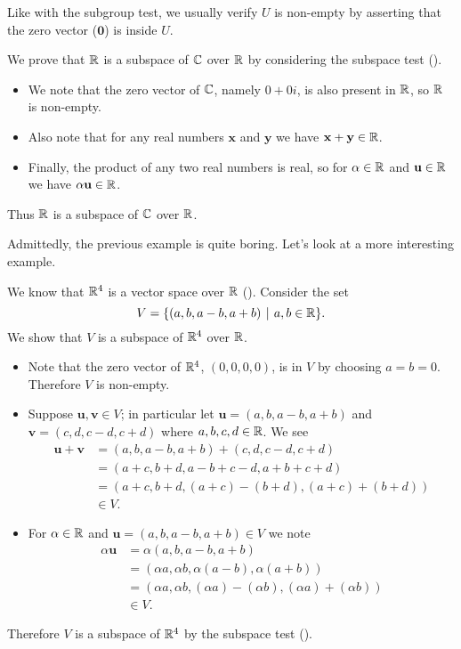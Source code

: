 \begin{remark}
    Like with the subgroup test, we usually verify $U$ is non-empty by asserting that the zero vector ($\mathbf{0}$) is inside $U$.
\end{remark}

\begin{example}
    We prove that $\mathbb{R}$ is a subspace of $\mathbb{C}$ over $\mathbb{R}$ by considering the subspace test ().
    \begin{itemize}
        \item We note that the zero vector of $\mathbb{C}$, namely $0 + 0i$, is also present in $\mathbb{R}$, so $\mathbb{R}$ is non-empty.
        \item Also note that for any real numbers $\mathbf{x}$ and $\mathbf{y}$ we have $\mathbf{x} + \mathbf{y} \in \mathbb{R}$.
        \item Finally, the product of any two real numbers is real, so for $\alpha \in \mathbb{R}$ and $\mathbf{u} \in \mathbb{R}$ we have $\alpha\mathbf{u} \in \mathbb{R}$.
    \end{itemize}
    Thus $\mathbb{R}$ is a subspace of $\mathbb{C}$ over $\mathbb{R}$.
\end{example}

Admittedly, the previous example is quite boring. Let's look at a more interesting example.
\begin{example}
    We know that $\mathbb{R}^4$ is a vector space over $\mathbb{R}$ (). Consider the set
    \[
        V = \{(a, b, a-b, a+b) \vert a, b \in \R\}.
    \]
    We show that $V$ is a subspace of $\mathbb{R}^4$ over $\mathbb{R}$.
    \begin{itemize}
        \item Note that the zero vector of $\mathbb{R}^4$, $(0,0,0,0)$, is in $V$ by choosing $a = b = 0$. Therefore $V$ is non-empty.
        \item Suppose $\mathbf{u}, \mathbf{v} \in V$; in particular let $\mathbf{u} = (a, b, a-b, a+b)$ and $\mathbf{v} = (c, d, c-d, c+d)$ where $a,b,c,d \in \mathbb{R}$. We see
        \begin{align*}
            \mathbf{u} + \mathbf{v} &= (a, b, a-b, a+b) + (c, d, c-d, c+d)\\
            &= (a + c, b + d, a - b + c - d, a + b + c + d)\\
            &= (a+c, b+d, (a+c)-(b+d), (a+c)+(b+d))\\
            &\in V.
        \end{align*}
        \item For $\alpha \in \mathbb{R}$ and $\mathbf{u} = (a, b, a-b, a+b) \in V$ we note
        \begin{align*}
            \alpha\mathbf{u} &= \alpha(a, b, a-b, a+b)\\
            &= (\alpha a, \alpha b, \alpha(a-b), \alpha(a+b))\\
            &= (\alpha a, \alpha b, (\alpha a) - (\alpha b), (\alpha a) + (\alpha b))\\
            &\in V.
        \end{align*}
    \end{itemize}
    Therefore $V$ is a subspace of $\mathbb{R}^4$ by the subspace test ().
\end{example}

